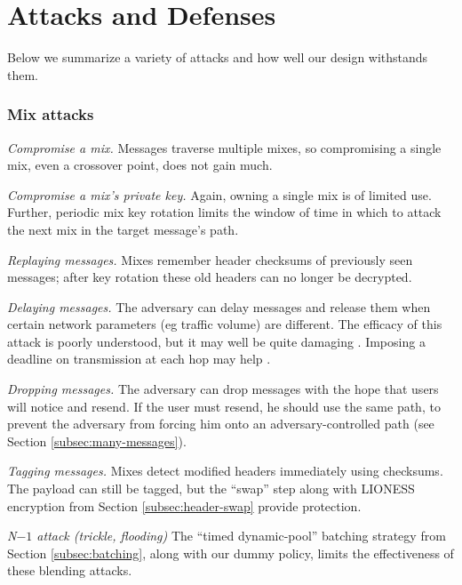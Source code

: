 \documentclass[11pt]{IEEEtran}
\begin{document}
\section{Attacks and Defenses}
\label{sec:attacks}

Below we summarize a variety of attacks and how well our design withstands
them.

\subsubsection{Mix attacks}
\label{subsec:mix-attacks}

\begin{description}
\item \emph{Compromise a mix.} Messages traverse multiple mixes, so
compromising a single mix, even a crossover point, does not gain much.
\item \emph{Compromise a mix's private key.} Again, owning a single mix
is of limited use. Further, periodic mix key rotation limits the window
of time in which to attack the next mix in the target message's path.
\item \emph{Replaying messages.}  Mixes remember header checksums of
previously seen messages; after key rotation these old headers can no
longer be decrypted.
\item \emph{Delaying messages.} The adversary can delay messages and
release them when certain network parameters (eg traffic volume) are
different. The efficacy of this attack is poorly understood, but it may
well be quite damaging \cite{batching-taxonomy}. Imposing a deadline on
transmission at each hop may help \cite{mix-acc}.
\item \emph{Dropping messages.} The adversary can drop messages with the
hope that users will notice and resend. If the user must resend, he
should use the same path, to prevent the adversary from forcing him onto
an adversary-controlled path (see Section \ref{subsec:many-messages}).
\item \emph{Tagging messages.} Mixes detect modified headers immediately
using checksums. The payload can still be tagged, but the ``swap'' step
along with LIONESS encryption from Section \ref{subsec:header-swap}
provide protection.
\item \emph{N$-1$ attack (trickle, flooding)} The ``timed dynamic-pool''
batching strategy from Section \ref{subsec:batching}, along with our dummy
policy, limits the effectiveness of these blending attacks.
\end{description}
\end{document}
